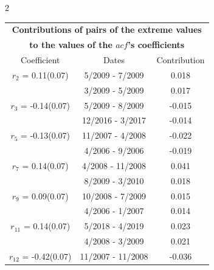 
\thispagestyle{empty}
\begin{multicols}{2}{ 
\begin{tabular}{ccc}
\multicolumn{3}{c}{\textbf{Contributions of pairs of the extreme values} }  \vspace{-.10in}  \\ 
\multicolumn{3}{c}{ \textbf{to the values of the $acf$'s coefficients}} \\ 
\hline 
\hline                  Coefficient  &  Dates &  Contribution \\ 
\hline 
  $r_{ 2}$ = 0.11(0.07) &       5/2009 -  7/2009 &        0.018   \vspace{-.10in} \\  
&        3/2009 -  5/2009 &        0.017  \vspace{-.02in} \\ \hline 
  $r_{ 3}$ = -0.14(0.07) &       5/2009 -  8/2009 &       -0.015    \vspace{-.10in} \\ 
  &       12/2016 -  3/2017 &       -0.014  \vspace{-.02in}   \\ \hline 
    $r_{ 5}$ = -0.13(0.07) &      11/2007 -  4/2008 &       -0.022    \vspace{-.10in} \\ 
  &        4/2006 -  9/2006 &       -0.019  \vspace{-.02in}   \\ \hline 
    $r_{ 7}$ = 0.14(0.07) &       4/2008 - 11/2008 &        0.041   \vspace{-.10in} \\  
&        8/2009 -  3/2010 &        0.018  \vspace{-.02in} \\ \hline 
  $r_{ 9}$ = 0.09(0.07) &      10/2008 -  7/2009 &        0.015   \vspace{-.10in} \\  
&        4/2006 -  1/2007 &        0.014  \vspace{-.02in} \\ \hline 
  $r_{11}$ = 0.14(0.07) &       5/2018 -  4/2019 &        0.023   \vspace{-.10in} \\  
&        4/2008 -  3/2009 &        0.021  \vspace{-.02in} \\ \hline 
  $r_{12}$ = -0.42(0.07) &      11/2007 - 11/2008 &       -0.036    \vspace{-.10in} \\ 

\end{tabular}}
\end{multicols}
